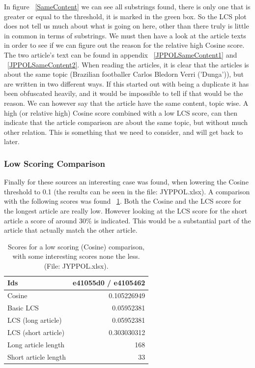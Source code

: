 In figure ~\ref{SameContent} we can see all substrings found, there is only one that is greater or equal to the threshold, it is marked in the green box. So the LCS plot does not tell us much about what is going on here, other than there truly is little in common in terms of substrings. We must then have a look at the article texts in order to see if we can figure out the reason for the relative high Cosine score. The two article's text can be found in appendix ~\ref{JPPOLSameContent1} and ~\ref{JPPOLSameContent2}. When reading the articles, it is clear that the articles is about the same topic (Brazilian footballer Carlos Bledorn Verri ('Dunga')), but are written in two different ways. If this started out with being a duplicate it has been obfuscated heavily, and it would be impossible to tell if that would be the reason. We can however say that the article have the same content, topic wise. A high (or relative high) Cosine score combined with a low LCS score, can then indicate that the article comparison are about the same topic, but without much other relation. This is something that we need to consider, and will get back to later.

\subsubsection{Low Scoring Comparison}
Finally for these sources an interesting case was found, when lowering the Cosine threshold to 0.1 (the results can be seen in the file: JYPPOL.xlsx). A comparison with the following scores was found ~\ref{JPPOLLowScoreMatch}. Both the Cosine and the LCS score for the longest article are really low. However looking at the LCS score for the short article a score of around 30\% is indicated. This would be a substantial part of the article that actually match the other article.

\begin{table}
\begin{center}
	\begin{tabular}{l | r}
	Ids & e41055d0 / e4105462\\ \hline
	Cosine & 0.105226949\\ \hline
	Basic LCS & 0.05952381\\ \hline
	LCS (long article) & 0.05952381\\ \hline
	LCS (short article) & 0.303030312\\ \hline
	Long article length & 168\\ \hline
	Short article length & 33\\ \hline	
	\end{tabular}
\end{center}
\caption{Scores for a low scoring (Cosine) comparison, with some interesting scores none the less. (File: JYPPOL.xlsx).}
\label{JPPOLLowScoreMatch}
\end{table}

